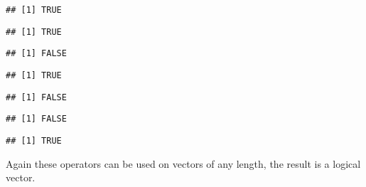 \documentclass[paper=a4,10pt,div=17,headsepline,BCOR=12mm,twoside,open=right]{scrbook}\usepackage{knitr}
\begin{document}
\begin{knitrout}\footnotesize
{}\color{fgcolor}\begin{kframe}
\begin{alltt}
 \hlopt{>} 
\end{alltt}
\begin{verbatim}
## [1] TRUE
\end{verbatim}
\begin{alltt}
 \hlopt{>=} 
\end{alltt}
\begin{verbatim}
## [1] TRUE
\end{verbatim}
\begin{alltt}
 \hlopt{==}  
\end{alltt}
\begin{verbatim}
## [1] FALSE
\end{verbatim}
\begin{alltt}
 \hlopt{!=} 
\end{alltt}
\begin{verbatim}
## [1] TRUE
\end{verbatim}
\begin{alltt}
 \hlopt{<=} 
\end{alltt}
\begin{verbatim}
## [1] FALSE
\end{verbatim}
\begin{alltt}
 \hlopt{<} 
\end{alltt}
\begin{verbatim}
## [1] FALSE
\end{verbatim}
\begin{alltt}
 \hlkwb{<-} 
 \hlopt{<}  \hlopt{&&}  \hlopt{>} 
\end{alltt}
\begin{verbatim}
## [1] TRUE
\end{verbatim}
\end{kframe}
\end{knitrout}

Again these operators can be used on vectors of any length, the result is a logical vector.
\end{document}
